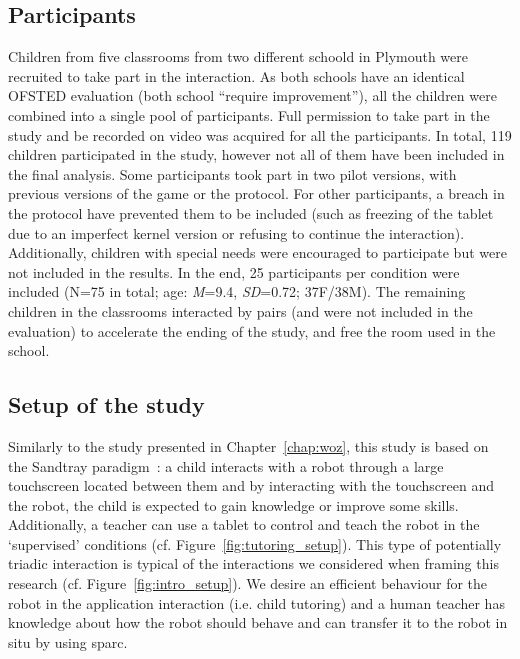\subsection{Participants}

Children from five classrooms from two different schoold in Plymouth were recruited to take part in the interaction. As both schools have an identical OFSTED evaluation (both school ``require improvement''), all the children were combined into a single pool of participants. Full permission to take part in the study and be recorded on video was acquired for all the participants. In total, 119 children participated in the study, however not all of them have been included in the final analysis. Some participants took part in two pilot versions, with previous versions of the game or the protocol. For other participants, a breach in the protocol have prevented them to be included (such as freezing of the tablet due to an imperfect kernel version or refusing to continue the interaction). Additionally, children with special needs were encouraged to participate but were not included in the results. In the end, 25 participants per condition were included (N=75 in total; age: \textit{M}=9.4, \textit{SD}=0.72; 37F/38M). The remaining children in the classrooms interacted by pairs (and were not included in the evaluation) to accelerate the ending of the study, and free the room used in the school. 

\subsection{Setup of the study}

Similarly to the study presented in Chapter~\ref{chap:woz}, this study is based on the Sandtray paradigm~\citep{baxter2012touchscreen}: a child interacts with a robot through a large touchscreen located between them and by interacting with the touchscreen and the robot, the child is expected to gain knowledge or improve some skills. Additionally, a teacher can use a tablet to control and teach the robot in the `supervised' conditions (cf. Figure~\ref{fig:tutoring_setup}). This type of potentially triadic interaction is typical of the interactions we considered when framing this research (cf. Figure~\ref{fig:intro_setup}). We desire an efficient behaviour for the robot in the application interaction (i.e. child tutoring) and a human teacher has knowledge about how the robot should behave and can transfer it to the robot in situ by using \gls{sparc}.

